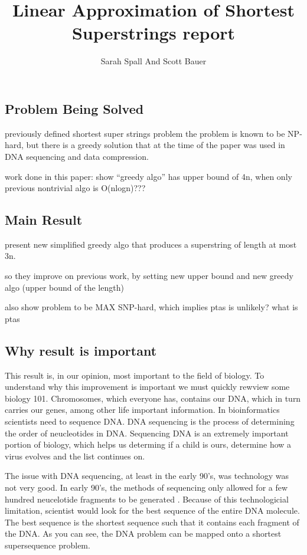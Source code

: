 \documentclass[letterpaper,twocolumn,12pt]{article}
\title{Linear Approximation of Shortest Superstrings report}
\author[1]{Sarah Spall And Scott Bauer}
\begin{document}
\maketitle

\subsection*{Problem Being Solved}

previously defined shortest super strings problem
the problem is known to be NP-hard, but there is a 
greedy solution that at the time of the paper was used
in DNA sequencing and data compression.  

work done in this paper:
show ``greedy algo'' has upper bound of 4n, when only
previous nontrivial algo is O(nlogn)???



\subsection*{Main Result}

present new simplified greedy algo that produces
a superstring of length at most 3n.  

so they improve on previous work, by setting new upper bound
and new greedy algo (upper bound of the length)

also show problem to be MAX SNP-hard, which implies 
ptas is unlikely? what is ptas



\subsection*{Why result is important}

This result is, in our opinion, most important to the field of biology. To understand why this improvement is important we must quickly rewview some biology 101. Chromosomes, which everyone has, contains our DNA, which in turn carries our genes, among other life important information. In bioinformatics scientists need to sequence DNA. DNA sequencing is the process of determining the order of neucleotides in DNA. Sequencing DNA is an extremely important portion of biology, which helps us determing if a child is ours, determine how a virus evolves and the list continues on. 

The issue with DNA sequencing, at least in the early 90's, was technology was not very good. In early 90's, the methods of sequencing only allowed for a few hundred neucelotide fragments to be generated \cite{karp1993mapping}. Because of this technologicial limitation, scientist would look for the best sequence of the entire DNA molecule. The best sequence is the shortest sequence such that it contains each fragment of the DNA. As you can see, the DNA problem can be mapped onto a shortest supersequence problem. 
\end{document}
